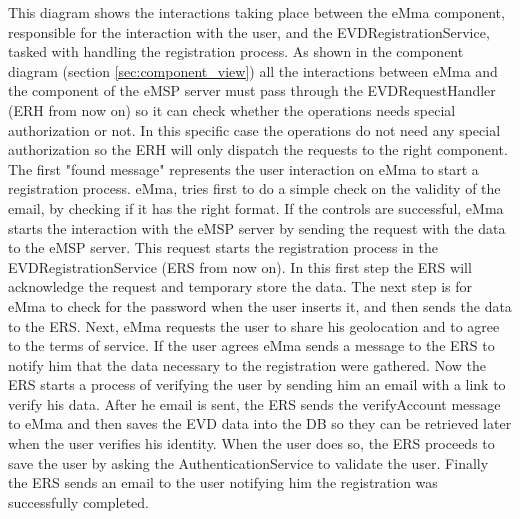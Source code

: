 This diagram shows the interactions taking place between the eMma component, responsible for the interaction with the user, and the EVDRegistrationService, tasked with handling the registration process. As shown in the component diagram (section \ref{sec:component_view}) all the interactions between eMma and the component of the eMSP server must pass through the EVDRequestHandler (ERH from now on) so it can check whether the operations needs special authorization or not. In this specific case the operations do not need any special authorization so the ERH will only dispatch the requests to the right component. The first "found message" represents the user interaction on eMma to start a registration process. eMma, tries first to do a simple check on the validity of the email, by checking if it has the right format. If the controls are successful, eMma starts the interaction with the eMSP server by sending the request with the data to the eMSP server. This request starts the registration process in the EVDRegistrationService (ERS from now on). In this first step the ERS will acknowledge the request and temporary store the data. The next step is for eMma to check for the password when the user inserts it, and then sends the data to the ERS. Next, eMma requests the user to share his geolocation and to agree to the terms of service. If the user agrees eMma sends a message to the ERS to notify him that the data necessary to the registration were gathered. Now the ERS starts a process of verifying the user by sending him an email with a link to verify his data. After he email is sent, the ERS sends the verifyAccount message to eMma and then saves the EVD data into the DB so they can be retrieved later when the user verifies his identity. When the user does so, the ERS proceeds to save the user by asking the AuthenticationService to validate the user. Finally the ERS sends an email to the user notifying him the registration was successfully completed.

